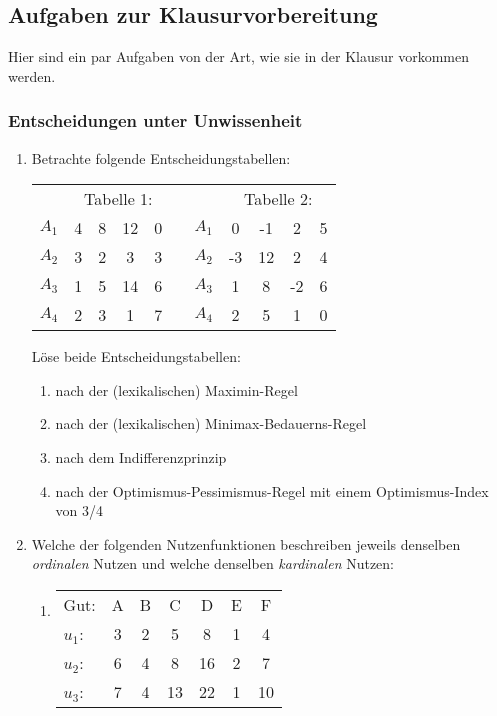 \subsection{Aufgaben zur Klausurvorbereitung}

Hier sind ein par Aufgaben von der Art, wie sie in der Klausur vorkommen werden.

\subsubsection{Entscheidungen unter Unwissenheit}

\begin{enumerate}
  \item Betrachte folgende Entscheidungstabellen:
\begin{center}
\begin{tabular}{c|c|c|c|c|cc|c|c|c|c|}
\multicolumn{1}{c}{} & \multicolumn{4}{c}{Tabelle 1:} &
\multicolumn{2}{c}{} & \multicolumn{4}{c}{Tabelle 2:}
\\
\cline{2-5} \cline{8-11}
$A_1$ & 4 &  8 & 12  & 0 & & $A_1$ & 0 & -1& 2 & 5 \\ 
\cline{2-5} \cline{8-11} 
$A_2$ & 3 &  2 & 3   & 3 & & $A_2$ & -3& 12& 2 & 4 \\ 
\cline{2-5} \cline{8-11}
$A_3$ & 1 &  5 & 14  & 6 & & $A_3$ & 1 & 8 & -2& 6 \\ 
\cline{2-5} \cline{8-11}
$A_4$ & 2 &  3 & 1   & 7 & & $A_4$ & 2 & 5 & 1 & 0 \\ 
\cline{2-5} \cline{8-11}
\end{tabular}
\end{center}
Löse beide Entscheidungstabellen:
\begin{enumerate}
  \item nach der (lexikalischen) Maximin-Regel
  \item nach der (lexikalischen) Minimax-Bedauerns-Regel
  \item nach dem Indifferenzprinzip
  \item nach der Optimismus-Pessimismus-Regel mit einem Optimismus-Index von 3/4
\end{enumerate}

\item Welche der folgenden Nutzenfunktionen beschreiben jeweils denselben
{\em ordinalen} Nutzen und welche denselben {\em kardinalen} Nutzen:
\begin{enumerate}
  \item \begin{tabular}{l|c|c|c|c|c|c|}
\cline{2-7}
Gut:                      & A & B & C & D & E & F \\
\cline{2-7}
 $u_1$:     & 3 & 2 & 5 & 8 & 1 & 4 \\
\cline{2-7}
 $u_2$:     & 6 & 4 & 8 & 16 & 2 & 7 \\
\cline{2-7}
 $u_3$:     & 7 & 4 & 13 & 22 & 1 & 10 \\
\cline{2-7}
\end{tabular}
 

\end{enumerate}
\end{enumerate}
